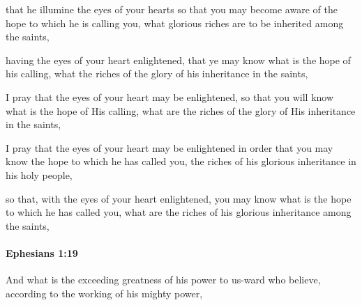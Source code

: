 			\begin{framed}
			\scriptsize
				\begin{compactdesc}
					\item[SBLG] 
					\item[AB 145] [. I ask] that he illumine the eyes of your hearts so that you may become aware of the hope to which he is calling you, what glorious riches are to be inherited among the saints,
					\item[ASV] having the eyes of your heart enlightened, that ye may know what is the hope of his calling, what the riches of the glory of his inheritance in the saints,
					\item[NASB] I pray that the eyes of your heart may be enlightened, so that you will know what is the hope of His calling, what are the riches of the glory of His inheritance in the saints,
					\item[NIV] I pray that the eyes of your heart may be enlightened in order that you may know the hope to which he has called you, the riches of his glorious inheritance in his holy people,
					\item[NRSV] so that, with the eyes of your heart enlightened, you may know what is the hope to which he has called you, what are the riches of his glorious inheritance among the saints,
				\end{compactdesc}
			\end{framed}

		\paragraph{Ephesians 1:19} %
			\label{EPHESIANS-1-19}

			And what is the exceeding greatness of his power to us-ward who believe, according to the working of his mighty power,

